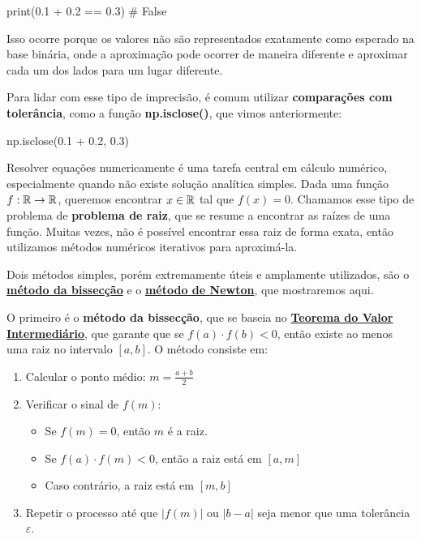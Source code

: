 \documentclass[11pt, a4paper]{article}
\begin{document}
\begin{code}
print(0.1 + 0.2 == 0.3)  # False
\end{code}

Isso ocorre porque os valores não são representados exatamente como esperado na base binária, onde a aproximação pode ocorrer de maneira diferente e aproximar cada um dos lados para um lugar diferente.

Para lidar com esse tipo de imprecisão, é comum utilizar \textbf{comparações com tolerância}, como a função \textbf{np.isclose()}, que vimos anteriormente:

\begin{code}
np.isclose(0.1 + 0.2, 0.3)
\end{code}

Resolver equações numericamente é uma tarefa central em cálculo numérico, especialmente quando não existe solução analítica simples. Dada uma função \( f: \mathbb{R} \rightarrow \mathbb{R} \), queremos encontrar \( x \in \mathbb{R} \) tal que \( f(x) = 0 \). Chamamos esse tipo de problema de \textbf{problema de raiz}, que se resume a encontrar as raízes de uma função. Muitas vezes, não é possível encontrar essa raiz de forma exata, então utilizamos métodos numéricos iterativos para aproximá-la.

Dois métodos simples, porém extremamente úteis e amplamente utilizados, são o \textbf{\href{https://en.wikipedia.org/wiki/Bisection_method}{método da bissecção}} e o \textbf{\href{https://en.wikipedia.org/wiki/Newton_method}{método de Newton}}, que mostraremos aqui.

O primeiro é o \textbf{método da bissecção}, que se baseia no \textbf{\href{https://en.wikipedia.org/wiki/Intermediate_value_theorem}{Teorema do Valor Intermediário}}, que garante que se \( f(a) \cdot f(b) < 0 \), então existe ao menos uma raiz no intervalo \( [a,b] \). O método consiste em:

\begin{enumerate}
    \item Calcular o ponto médio: \( m = \frac{a + b}{2} \)
    \item Verificar o sinal de \( f(m) \):
        \begin{itemize}
            \item Se \( f(m) = 0 \), então \( m \) é a raiz.
            \item Se \( f(a) \cdot f(m) < 0 \), então a raiz está em \( [a, m] \)
            \item Caso contrário, a raiz está em \( [m, b] \)
        \end{itemize}
    \item Repetir o processo até que \( |f(m)| \) ou \( |b - a| \) seja menor que uma tolerância \(\varepsilon\).
\end{enumerate}
\end{document}
